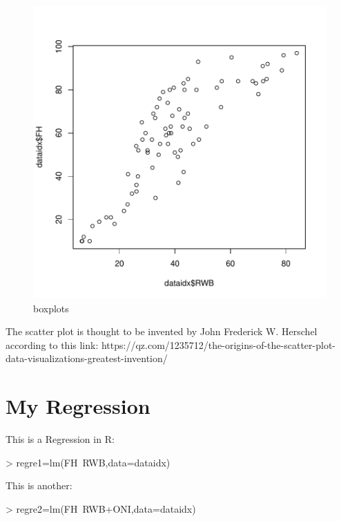 \documentclass[11pt]{article}
\begin{document}
\begin{figure}[h]
\centering
\begin{adjustbox}{width=7cm,height=5.5cm,clip,trim=0cm 1cm 0cm 0cm} 
\includegraphics{PaperInR_6-numnum_plot}
\end{adjustbox}
\caption{boxplots}  %
\label{numnum_plot} %
\end{figure}


The scatter plot is thought to be invented by  John Frederick W. Herschel according to this link: https://qz.com/1235712/the-origins-of-the-scatter-plot-data-visualizations-greatest-invention/

\section{My Regression}\label{regre}

This is a Regression in R:

\begin{Schunk}
\begin{Sinput}
> regre1=lm(FH~RWB,data=dataidx)
\end{Sinput}
\end{Schunk}

This is another:

\begin{Schunk}
\begin{Sinput}
> regre2=lm(FH~RWB+ONI,data=dataidx)
\end{Sinput}
\end{Schunk}
\end{document}
